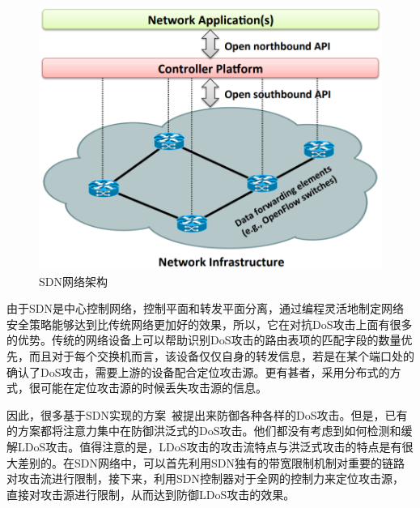 \begin{figure}
    \centering
    \includegraphics[scale=0.5]{figures/SDNnetwork.png}
    \caption{SDN网络架构}
    \label{fig:sdnfig}
\end{figure}

由于SDN是中心控制网络，控制平面和转发平面分离，通过编程灵活地制定网络安全策略能够达到比传统网络更加好的效果，所以，它在对抗DoS攻击上面有很多的优势。传统的网络设备上可以帮助识别DoS攻击的路由表项的匹配字段的数量优先，而且对于每个交换机而言，该设备仅仅自身的转发信息，若是在某个端口处的确认了DoS攻击，需要上游的设备配合定位攻击源。更有甚者，采用分布式的方式，很可能在定位攻击源的时候丢失攻击源的信息。

因此，很多基于SDN实现的方案~\cite{b9, b16, b11, b23, b24}被提出来防御各种各样的DoS攻击。但是，已有的方案都将注意力集中在防御洪泛式的DoS攻击。他们都没有考虑到如何检测和缓解LDoS攻击。值得注意的是，LDoS攻击的攻击流特点与洪泛式攻击的特点是有很大差别的。在SDN网络中，可以首先利用SDN独有的带宽限制机制对重要的链路对攻击流进行限制，接下来，利用SDN控制器对于全网的控制力来定位攻击源，直接对攻击源进行限制，从而达到防御LDoS攻击的效果。


